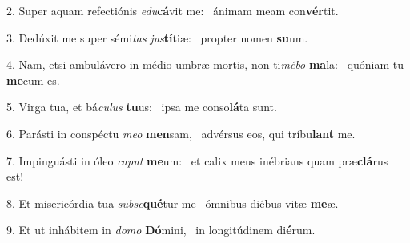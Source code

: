 2. Super aquam refectiónis \textit{e}\textit{du}\textbf{cá}vit me: \ast\  ánimam meam con\textbf{vér}tit.\

3. Dedúxit me super sémi\textit{tas} \textit{jus}\textbf{tí}tiæ: \ast\  propter nomen \textbf{su}um.\

4. Nam, etsi ambulávero in médio umbræ mortis, non ti\textit{mé}\textit{bo} \textbf{ma}la: \ast\  quóniam tu \textbf{me}cum es.\

5. Virga tua, et bá\textit{cu}\textit{lus} \textbf{tu}us: \ast\  ipsa me conso\textbf{lá}ta sunt.\

6. Parásti in conspéctu \textit{me}\textit{o} \textbf{men}sam, \ast\  advérsus eos, qui tríbu\textbf{lant} me.\

7. Impinguásti in óleo \textit{ca}\textit{put} \textbf{me}um: \ast\  et calix meus inébrians quam præ\textbf{clá}rus est!\

8. Et misericórdia tua \textit{sub}\textit{se}\textbf{qué}tur me \ast\  ómnibus diébus vitæ \textbf{me}æ.\

9. Et ut inhábitem in \textit{do}\textit{mo} \textbf{Dó}mini, \ast\  in longitúdinem di\textbf{é}rum.\

